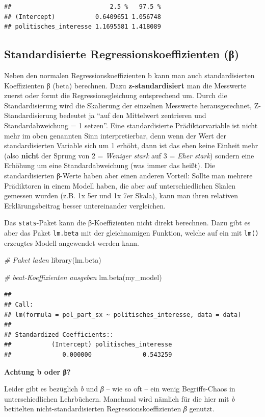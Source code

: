 \documentclass[
]{book}
\newenvironment{Shaded}{\begin{snugshade}}{\end{snugshade}}
\newcommand{\CommentTok}[1]{\textcolor[rgb]{0.56,0.35,0.01}{\textit{#1}}}
\newcommand{\FunctionTok}[1]{\textcolor[rgb]{0.00,0.00,0.00}{#1}}
\newcommand{\NormalTok}[1]{#1}
\begin{document}
\begin{verbatim}
##                           2.5 %   97.5 %
## (Intercept)           0.6409651 1.056748
## politisches_interesse 1.1695581 1.418089
\end{verbatim}

\hypertarget{standardisierte-regressionskoeffizienten-ux3b2}{%
\subsection{Standardisierte Regressionskoeffizienten (β)}\label{standardisierte-regressionskoeffizienten-ux3b2}}

Neben den normalen Regressionskoeffizienten b kann man auch standardisierten Koeffizienten β (beta) berechnen. Dazu \textbf{z-standardisiert} man die Messwerte zuerst oder formt die Regressionsgleichung entsprechend um. Durch die Standardisierung wird die Skalierung der einzelnen Messwerte herausgerechnet, Z-Standardisierung bedeutet ja ``auf den Mittelwert zentrieren und Standardabweichung = 1 setzen''. Eine standardisierte Prädiktorvariable ist nicht mehr im oben genannten Sinn interpretierbar, denn wenn der Wert der standardisierten Variable sich um 1 erhöht, dann ist das eben keine Einheit mehr (also \textbf{nicht} der Sprung von 2 = \emph{Weniger stark} auf 3 = \emph{Eher stark}) sondern eine Erhöhung um eine Standardabweichung (was immer das heißt). Die standardisierten β-Werte haben aber einen anderen Vorteil: Sollte man mehrere Prädiktoren in einem Modell haben, die aber auf unterschiedlichen Skalen gemessen wurden (z.B. 1x 5er und 1x 7er Skala), kann man ihren relativen Erklärungsbeitrag besser untereinander vergleichen.

Das \texttt{stats}-Paket kann die β-Koeffizienten nicht direkt berechnen. Dazu gibt es aber das Paket \texttt{lm.beta} mit der gleichnamigen Funktion, welche auf ein mit \texttt{lm()} erzeugtes Modell angewendet werden kann.

\begin{Shaded}
\begin{Highlighting}[]
\CommentTok{\# Paket laden}
\FunctionTok{library}\NormalTok{(lm.beta)  }

\CommentTok{\# beat{-}Koeffizienten ausgeben}
\FunctionTok{lm.beta}\NormalTok{(my\_model) }
\end{Highlighting}
\end{Shaded}

\begin{verbatim}
## 
## Call:
## lm(formula = pol_part_sx ~ politisches_interesse, data = data)
## 
## Standardized Coefficients::
##           (Intercept) politisches_interesse 
##              0.000000              0.543259
\end{verbatim}

\leavevmode\hypertarget{info_beta}{}%
\textbf{Achtung b oder β?}

Leider gibt es bezüglich \emph{b} und \emph{β} -- wie so oft -- ein wenig Begriffs-Chaos in unterschiedlichen Lehrbüchern. Manchmal wird nämlich für die hier mit \emph{b} betitelten nicht-standardisierten Regressionskoeffizienten \emph{β} genutzt.

  
\end{document}
